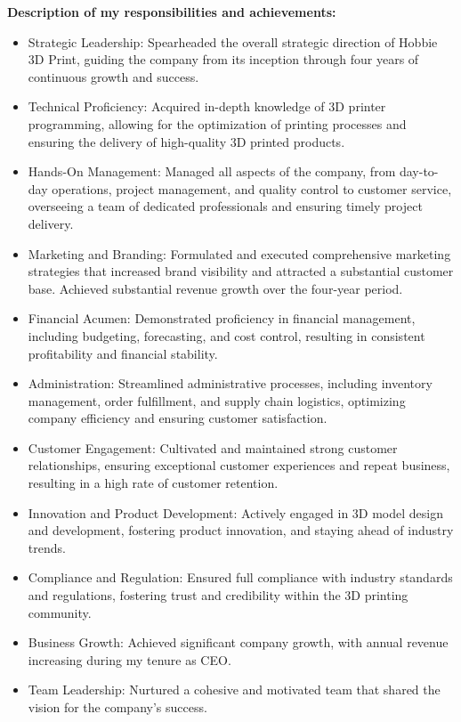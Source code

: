 \documentclass[a4paper,10pt]{article}
\begin{document}
\textbf{Description of my responsibilities and achievements:}
\begin{itemize}
    \item Strategic Leadership: Spearheaded the overall strategic direction of Hobbie 3D Print, guiding the company from its inception through four years of continuous growth and success.
    \item Technical Proficiency: Acquired in-depth knowledge of 3D printer programming, allowing for the optimization of printing processes and ensuring the delivery of high-quality 3D printed products.
    \item Hands-On Management: Managed all aspects of the company, from day-to-day operations, project management, and quality control to customer service, overseeing a team of dedicated professionals and ensuring timely project delivery.
    \item Marketing and Branding: Formulated and executed comprehensive marketing strategies that increased brand visibility and attracted a substantial customer base. Achieved substantial revenue growth over the four-year period.
    \item Financial Acumen: Demonstrated proficiency in financial management, including budgeting, forecasting, and cost control, resulting in consistent profitability and financial stability.
    \item Administration: Streamlined administrative processes, including inventory management, order fulfillment, and supply chain logistics, optimizing company efficiency and ensuring customer satisfaction.
    \item Customer Engagement: Cultivated and maintained strong customer relationships, ensuring exceptional customer experiences and repeat business, resulting in a high rate of customer retention.
    \item Innovation and Product Development: Actively engaged in 3D model design and development, fostering product innovation, and staying ahead of industry trends.
    \item Compliance and Regulation: Ensured full compliance with industry standards and regulations, fostering trust and credibility within the 3D printing community.
    \item Business Growth: Achieved significant company growth, with annual revenue increasing during my tenure as CEO.
    \item Team Leadership: Nurtured a cohesive and motivated team that shared the vision for the company's success.
\end{itemize}
\end{document}
